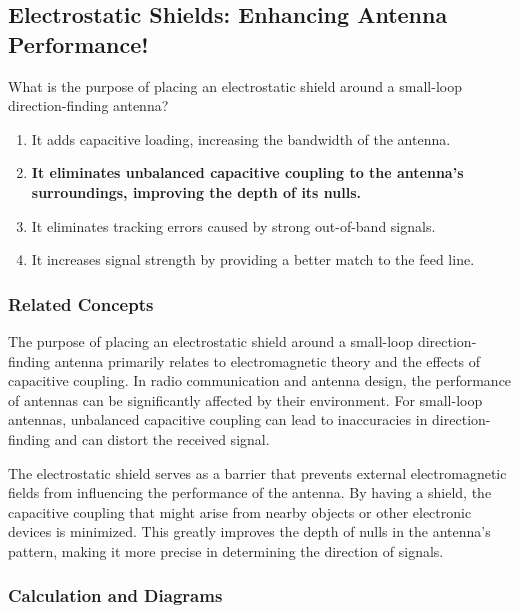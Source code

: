 \subsection{Electrostatic Shields: Enhancing Antenna Performance!}

\begin{tcolorbox}[colback=gray!10, colframe=black, title=E9H04] 
What is the purpose of placing an electrostatic shield around a small-loop direction-finding antenna? \\

\begin{enumerate}[label=\Alph*.]
    \item It adds capacitive loading, increasing the bandwidth of the antenna.
    \item \textbf{It eliminates unbalanced capacitive coupling to the antenna’s surroundings, improving the depth of its nulls.}
    \item It eliminates tracking errors caused by strong out-of-band signals.
    \item It increases signal strength by providing a better match to the feed line.
\end{enumerate} \end{tcolorbox}

\subsubsection{Related Concepts}

The purpose of placing an electrostatic shield around a small-loop direction-finding antenna primarily relates to electromagnetic theory and the effects of capacitive coupling. In radio communication and antenna design, the performance of antennas can be significantly affected by their environment. For small-loop antennas, unbalanced capacitive coupling can lead to inaccuracies in direction-finding and can distort the received signal.

The electrostatic shield serves as a barrier that prevents external electromagnetic fields from influencing the performance of the antenna. By having a shield, the capacitive coupling that might arise from nearby objects or other electronic devices is minimized. This greatly improves the depth of nulls in the antenna's pattern, making it more precise in determining the direction of signals.

\subsubsection{Calculation and Diagrams}

